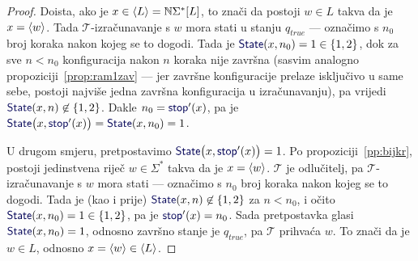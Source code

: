 \begin{proof}
Doista, ako je $x\in\langle L\rangle={\mathbb N}\Sigma^*[L]$, to znači da postoji $w\in L$ takva da je $x=\langle w\rangle$. Tada $\mathcal T$-izračunavanje s $w$ mora stati u stanju $q_\mathit{true}$ --- označimo s $n_0$ broj koraka nakon kojeg se to dogodi. Tada je $\f{State}(x,n_0)=1\in\{1,2\}$, dok za sve $n<n_0$ konfiguracija nakon $n$ koraka nije završna (sasvim analogno propoziciji~\ref{prop:ram1zav} --- jer završne konfiguracije prelaze isključivo u same sebe, postoji najviše jedna završna konfiguracija u izračunavanju), pa vrijedi $\f{State}(x,n)\not\in\{1,2\}$. Dakle $n_0=\f{stop}'(x)$, pa je $\f{State}\bigl(x,\f{stop}'(x)\bigr)=\f{State}(x,n_0)=1$.

U drugom smjeru, pretpostavimo $\f{State}\bigl(x,\f{stop}'(x)\bigr)=1$. Po propoziciji~\ref{pp:bijkr}, postoji jedinstvena riječ $w\in\Sigma^*$ takva da je $x=\langle w\rangle$. $\mathcal T$ je odlučitelj, pa $\mathcal T$-izračunavanje s $w$ mora stati --- označimo s $n_0$ broj koraka nakon kojeg se to dogodi. Tada je (kao i prije) $\f{State}(x,n)\not\in\{1,2\}$ za $n<n_0$, i očito $\f{State}(x,n_0)=1\in\{1,2\}$, pa je $\f{stop}'(x)=n_0$. Sada pretpostavka glasi $\f{State}(x,n_0)=1$, odnosno završno stanje je $q_{\mathit{true}}$, pa $\mathcal T$ prihvaća $w$. To znači da je $w\in L$, odnosno $x=\langle w\rangle\in\langle L\rangle$.
\end{proof}
\newpage

